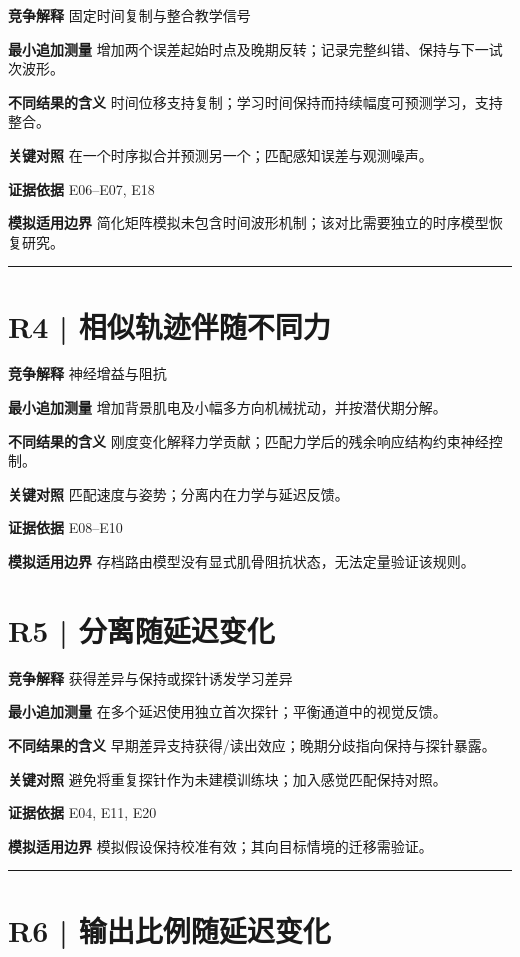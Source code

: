 \documentclass[11pt,a4paper]{article}
\begin{document}
\medskip\textbf{竞争解释} 固定时间复制与整合教学信号\par
\medskip\textbf{最小追加测量} 增加两个误差起始时点及晚期反转；记录完整纠错、保持与下一试次波形。\par
\medskip\textbf{不同结果的含义} 时间位移支持复制；学习时间保持而持续幅度可预测学习，支持整合。\par
\medskip\textbf{关键对照} 在一个时序拟合并预测另一个；匹配感知误差与观测噪声。\par
\medskip\textbf{证据依据} E06--E07, E18\par
\medskip\textbf{模拟适用边界} 简化矩阵模拟未包含时间波形机制；该对比需要独立的时序模型恢复研究。\par
\bigskip\hrule\medskip\section{R4 | 相似轨迹伴随不同力}
\medskip\textbf{竞争解释} 神经增益与阻抗\par
\medskip\textbf{最小追加测量} 增加背景肌电及小幅多方向机械扰动，并按潜伏期分解。\par
\medskip\textbf{不同结果的含义} 刚度变化解释力学贡献；匹配力学后的残余响应结构约束神经控制。\par
\medskip\textbf{关键对照} 匹配速度与姿势；分离内在力学与延迟反馈。\par
\medskip\textbf{证据依据} E08--E10\par
\medskip\textbf{模拟适用边界} 存档路由模型没有显式肌骨阻抗状态，无法定量验证该规则。\par
\clearpage\section{R5 | 分离随延迟变化}
\medskip\textbf{竞争解释} 获得差异与保持或探针诱发学习差异\par
\medskip\textbf{最小追加测量} 在多个延迟使用独立首次探针；平衡通道中的视觉反馈。\par
\medskip\textbf{不同结果的含义} 早期差异支持获得/读出效应；晚期分歧指向保持与探针暴露。\par
\medskip\textbf{关键对照} 避免将重复探针作为未建模训练块；加入感觉匹配保持对照。\par
\medskip\textbf{证据依据} E04, E11, E20\par
\medskip\textbf{模拟适用边界} 模拟假设保持校准有效；其向目标情境的迁移需验证。\par
\bigskip\hrule\medskip\section{R6 | 输出比例随延迟变化}
\end{document}
